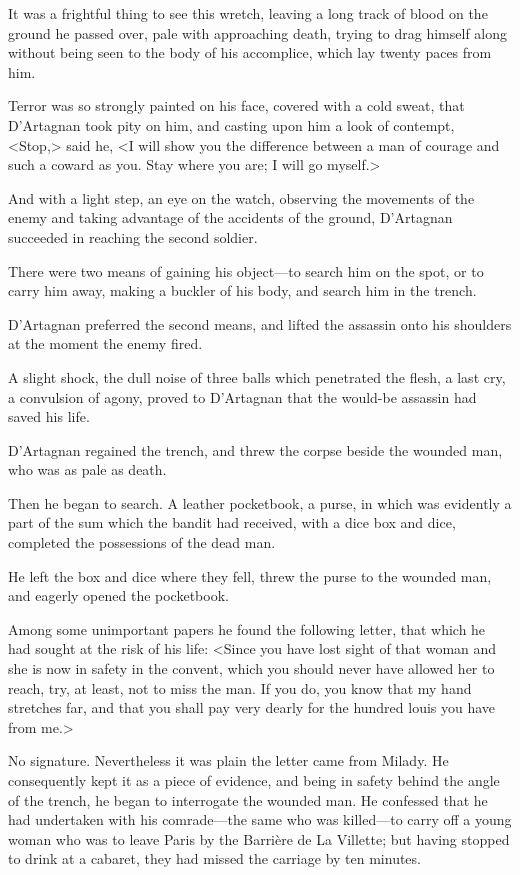 It was a frightful thing to see this wretch, leaving a long track of blood on the ground he passed over, pale with approaching death, trying to drag himself along without being seen to the body of his accomplice, which lay twenty paces from him. 

Terror was so strongly painted on his face, covered with a cold sweat, that D'Artagnan took pity on him, and casting upon him a look of contempt, <Stop,> said he, <I will show you the difference between a man of courage and such a coward as you. Stay where you are; I will go myself.> 

And with a light step, an eye on the watch, observing the movements of the enemy and taking advantage of the accidents of the ground, D'Artagnan succeeded in reaching the second soldier. 

There were two means of gaining his object—to search him on the spot, or to carry him away, making a buckler of his body, and search him in the trench. 

D'Artagnan preferred the second means, and lifted the assassin onto his shoulders at the moment the enemy fired. 

A slight shock, the dull noise of three balls which penetrated the flesh, a last cry, a convulsion of agony, proved to D'Artagnan that the would-be assassin had saved his life. 

D'Artagnan regained the trench, and threw the corpse beside the wounded man, who was as pale as death. 

Then he began to search. A leather pocketbook, a purse, in which was evidently a part of the sum which the bandit had received, with a dice box and dice, completed the possessions of the dead man. 

He left the box and dice where they fell, threw the purse to the wounded man, and eagerly opened the pocketbook. 

Among some unimportant papers he found the following letter, that which he had sought at the risk of his life: <Since you have lost sight of that woman and she is now in safety in the convent, which you should never have allowed her to reach, try, at least, not to miss the man. If you do, you know that my hand stretches far, and that you shall pay very dearly for the hundred louis you have from me.> 

No signature. Nevertheless it was plain the letter came from Milady. He consequently kept it as a piece of evidence, and being in safety behind the angle of the trench, he began to interrogate the wounded man. He confessed that he had undertaken with his comrade—the same who was killed—to carry off a young woman who was to leave Paris by the Barrière de La Villette; but having stopped to drink at a cabaret, they had missed the carriage by ten minutes. 

